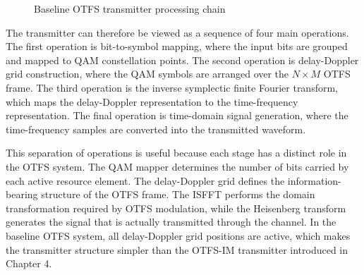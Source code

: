 \begin{figure}[H]
    \centering
    \caption{Baseline OTFS transmitter processing chain}
    \label{fig:otfs_transmitter_chain}
\end{figure}

The transmitter can therefore be viewed as a sequence of four main operations. The first operation is bit-to-symbol mapping, where the input bits are grouped and mapped to QAM constellation points. The second operation is delay-Doppler grid construction, where the QAM symbols are arranged over the \(N \times M\) OTFS frame. The third operation is the inverse symplectic finite Fourier transform, which maps the delay-Doppler representation to the time-frequency representation. The final operation is time-domain signal generation, where the time-frequency samples are converted into the transmitted waveform.

This separation of operations is useful because each stage has a distinct role in the OTFS system. The QAM mapper determines the number of bits carried by each active resource element. The delay-Doppler grid defines the information-bearing structure of the OTFS frame. The ISFFT performs the domain transformation required by OTFS modulation, while the Heisenberg transform generates the signal that is actually transmitted through the channel. In the baseline OTFS system, all delay-Doppler grid positions are active, which makes the transmitter structure simpler than the OTFS-IM transmitter introduced in Chapter 4.

